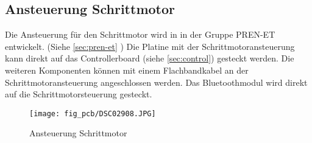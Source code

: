\subsection{Ansteuerung Schrittmotor}
\label{sec:stepperdriver}
Die Ansteuerung für den Schrittmotor wird in in der Gruppe PREN-ET entwickelt. 
(Siehe \ref{sec:pren-et} ) Die Platine mit der 
Schrittmotoransteuerung kann direkt auf das Controllerboard (siehe 
\ref{sec:control}) gesteckt werden.  Die weiteren Komponenten können mit einem 
Flachbandkabel an der Schrittmotoransteuerung angeschlossen werden. Das 
Bluetoothmodul wird direkt auf die Schrittmotorsteuerung gesteckt. 
\begin{figure}[h!]
    \centering
    \texttt{[image: fig\_pcb/DSC02908.JPG]}
    \caption{Ansteuerung Schrittmotor}
    \label{fig:dc}
\end{figure}

